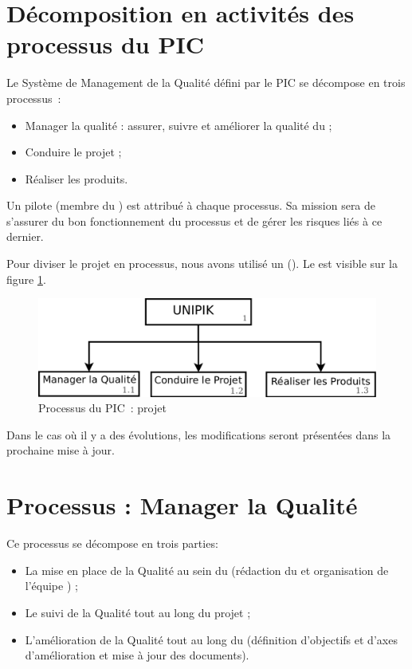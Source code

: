 \section{Décomposition en activités des processus du PIC}

Le Système de Management de la Qualité défini par le PIC \nomPIC{} se décompose en trois processus~:
\begin{itemize}
 \item Manager la qualité : assurer, suivre et améliorer la qualité du \PICCourt ; 
 \item Conduire le projet ;
 \item Réaliser les produits. \\
\end{itemize}

Un pilote (membre du \PICCourt) est attribué à chaque processus. Sa mission sera de s'assurer du bon fonctionnement du processus et de gérer les risques liés à ce dernier.

Pour diviser le projet en processus, nous avons utilisé un \WBS{} (\WBSCourt). Le \WBSCourt{} est visible sur la figure \ref{WBS1}.

\begin{figure}[H]
\centering
 \includegraphics[width=14cm]{images/organigramme_processus_pic.png}
 \caption{Processus du PIC~: projet \nomEquipe{}}
 \label{WBS1}
\end{figure}

 Dans le cas où il y a des évolutions, les modifications seront présentées dans la prochaine mise à jour.
\newpage
 
\section{Processus : Manager la Qualité}
\label{ProcessusQualite}
Ce processus se décompose en trois parties:
\begin{itemize}
\item La mise en place de la Qualité au sein du \PICCourt{} (rédaction du \PQ{} et organisation de l'équipe \PICCourt) ; 
\item Le suivi de la Qualité tout au long du projet ; 
\item L'amélioration de la Qualité tout au long du \PICCourt{} (définition d'objectifs et d'axes d'amélioration et mise à jour des documents). 
\end{itemize}
